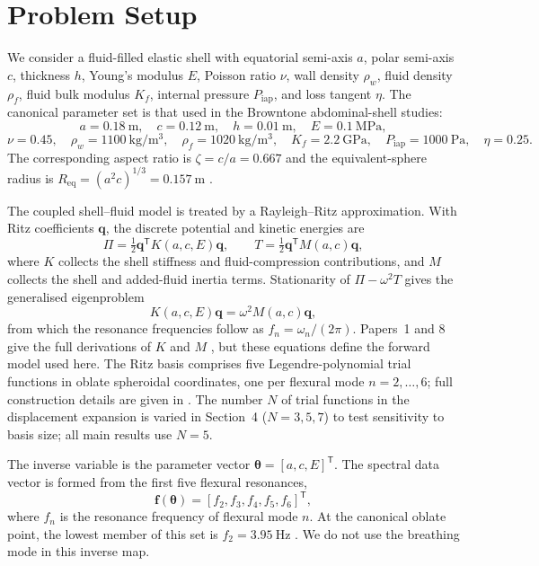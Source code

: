 \section{Problem Setup}

We consider a fluid-filled elastic shell with equatorial semi-axis $a$, polar
semi-axis $c$, thickness $h$, Young's modulus $E$, Poisson ratio $\nu$, wall
density $\rho_w$, fluid density $\rho_f$, fluid bulk modulus $K_f$,
internal pressure $P_\mathrm{iap}$, and loss tangent $\eta$.  The canonical parameter set is that used in
the Browntone abdominal-shell studies:
\[
  a=\SI{0.18}{\metre},\quad
  c=\SI{0.12}{\metre},\quad
  h=\SI{0.01}{\metre},\quad
  E=\SI{0.1}{\mega\pascal},
\]
\[
  \nu=\num{0.45},\quad
  \rho_w=\SI{1100}{\kilo\gram\per\metre\cubed},\quad
  \rho_f=\SI{1020}{\kilo\gram\per\metre\cubed},\quad
  K_f=\SI{2.2}{\giga\pascal},\quad
  P_\mathrm{iap}=\SI{1000}{\pascal},\quad
  \eta=\num{0.25}.
\]
The corresponding aspect ratio is $\zeta=c/a=\num{0.667}$ and the
equivalent-sphere radius is
$R_\mathrm{eq}=(a^2c)^{1/3}=\SI{0.157}{\metre}$ \cite{BrowntoneP1,BrowntoneP8}.

The coupled shell--fluid model is treated by a Rayleigh--Ritz approximation.
With Ritz coefficients $\mathbf{q}$, the discrete potential and kinetic
energies are
\[
  \Pi=\tfrac{1}{2}\mathbf{q}^\mathsf{T}K(a,c,E)\mathbf{q},
  \qquad
  T=\tfrac{1}{2}\mathbf{q}^\mathsf{T}M(a,c)\mathbf{q},
\]
where $K$ collects the shell stiffness and fluid-compression contributions, and
$M$ collects the shell and added-fluid inertia terms.  Stationarity of
$\Pi-\omega^2T$ gives the generalised eigenproblem
\[
  K(a,c,E)\mathbf{q}=\omega^2 M(a,c)\mathbf{q},
\]
from which the resonance frequencies follow as $f_n=\omega_n/(2\pi)$.
Papers~1 and 8 give the full derivations of $K$ and $M$
\cite{BrowntoneP1,BrowntoneP8}, but these equations define the forward model
used here.  The Ritz basis comprises five Legendre-polynomial trial functions in
oblate spheroidal coordinates, one per flexural mode $n=2,\ldots,6$; full
construction details are given in \cite{BrowntoneP1}.  The number $N$ of trial
functions in the displacement expansion is varied in Section~4 ($N=3,5,7$) to
test sensitivity to basis size; all main results use $N=5$.

The inverse variable is the parameter vector
$\boldsymbol{\theta}=[a,c,E]^\mathsf{T}$.  The spectral data vector is formed
from the first five flexural resonances,
\[
  \mathbf{f}(\boldsymbol{\theta})
  =
  [f_2,f_3,f_4,f_5,f_6]^\mathsf{T},
\]
where $f_n$ is the resonance frequency of flexural mode $n$.  At the canonical
oblate point, the lowest member of this set is
$f_2=\SI{3.95}{\hertz}$ \cite{BrowntoneP1}.  We do not use the breathing mode in
this inverse map.

